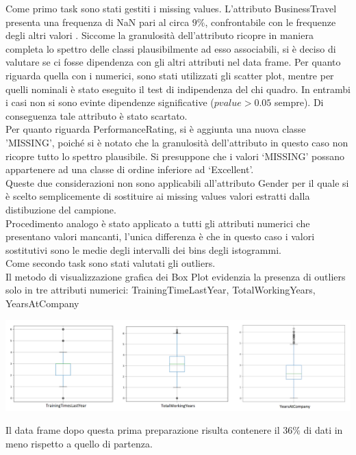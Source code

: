 \documentclass[a4paper,9pt]{article}
\begin{document}
Come primo task sono stati gestiti i missing values.
L'attributo BusinessTravel presenta una frequenza di NaN pari al circa $9\%$, confrontabile con le frequenze degli altri valori . Siccome la granulosità dell'attributo ricopre in maniera completa lo spettro delle classi plausibilmente ad esso associabili, si è deciso di valutare se ci fosse dipendenza con gli altri attributi nel data frame. Per quanto riguarda quella con i numerici, sono stati utilizzati gli scatter plot, mentre per quelli nominali è stato eseguito il test di indipendenza del chi quadro. In entrambi i casi non si sono evinte dipendenze significative ($p value > 0.05$ sempre). Di conseguenza tale attributo è stato scartato.\\
Per quanto riguarda PerformanceRating, si è aggiunta una nuova classe 'MISSING', poiché si è notato che la granulosità dell'attributo in questo caso non ricopre tutto lo spettro plausibile. Si presuppone che i valori `MISSING' possano appartenere ad una classe di ordine inferiore ad `Excellent'.\\
Queste due considerazioni non sono applicabili all'attributo Gender per il quale si è scelto semplicemente di sostituire ai missing values valori estratti dalla distibuzione del campione.\\
Procedimento analogo è stato applicato a tutti gli attributi numerici che presentano valori mancanti, l'unica differenza è che in questo caso i valori sostitutivi sono le medie degli intervalli dei bins degli istogrammi.\\ %
Come secondo task sono stati valutati gli outliers.\\
Il metodo di visualizzazione grafica dei Box Plot evidenzia la presenza di outliers solo in tre attributi numerici: TrainingTimeLastYear, TotalWorkingYears, YearsAtCompany
\begin{center}
\includegraphics[scale=1]{boxplot.png}
\end{center}
 Il data frame dopo questa prima preparazione risulta contenere il $36\%$ di dati in meno rispetto a quello di partenza.\\
\end{document}
